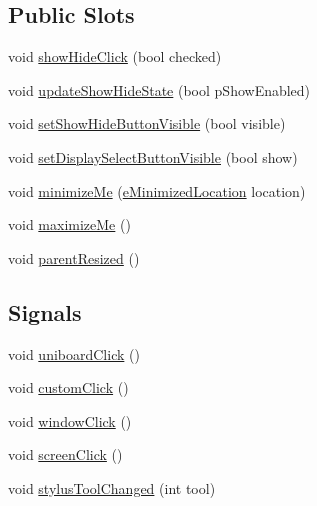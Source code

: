 \subsection*{Public Slots}
\begin{DoxyCompactItemize}
\item 
void \hyperlink{class_u_b_desktop_palette_ae18c3f2e1a1cca67dd75a4644785b500}{show\-Hide\-Click} (bool checked)
\item 
void \hyperlink{class_u_b_desktop_palette_ac67643756fbb45337db691a38ec1c5db}{update\-Show\-Hide\-State} (bool p\-Show\-Enabled)
\item 
void \hyperlink{class_u_b_desktop_palette_a51056d43f888c39ee592e174aac14fe5}{set\-Show\-Hide\-Button\-Visible} (bool visible)
\item 
void \hyperlink{class_u_b_desktop_palette_a0132b7753267b61b686e38c9e78339d7}{set\-Display\-Select\-Button\-Visible} (bool show)
\item 
void \hyperlink{class_u_b_desktop_palette_a03eb348784b56775c866f8a8d8de3777}{minimize\-Me} (\hyperlink{_u_b_floating_palette_8h_ac8adc001960a33bd6c76686f775bd7eb}{e\-Minimized\-Location} location)
\item 
void \hyperlink{class_u_b_desktop_palette_a76e828e82a422ea1d0830888b8911e4e}{maximize\-Me} ()
\item 
void \hyperlink{class_u_b_desktop_palette_a1ce83b9fed474f9d107a2ab2c518e75c}{parent\-Resized} ()
\end{DoxyCompactItemize}
\subsection*{Signals}
\begin{DoxyCompactItemize}
\item 
void \hyperlink{class_u_b_desktop_palette_a40ee5188759874e0935124ce5dc668c6}{uniboard\-Click} ()
\item 
void \hyperlink{class_u_b_desktop_palette_a96357c5b3e193fd280871cef7cc15313}{custom\-Click} ()
\item 
void \hyperlink{class_u_b_desktop_palette_af66f822466236ae7653bba638531fb1d}{window\-Click} ()
\item 
void \hyperlink{class_u_b_desktop_palette_afb5f925ec6d7f814dcb5e6f84bc729f7}{screen\-Click} ()
\item 
void \hyperlink{class_u_b_desktop_palette_a74712648d611ebdb6639b53ef4f5461a}{stylus\-Tool\-Changed} (int tool)
\end{DoxyCompactItemize}
